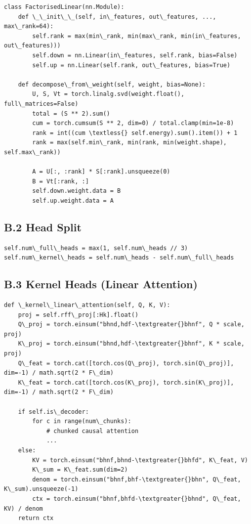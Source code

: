 \begin{lstlisting}
class FactorisedLinear(nn.Module):
    def \_\_init\_\_(self, in\_features, out\_features, ..., max\_rank=64):
        self.rank = max(min\_rank, min(max\_rank, min(in\_features, out\_features)))
        self.down = nn.Linear(in\_features, self.rank, bias=False)
        self.up = nn.Linear(self.rank, out\_features, bias=True)

    def decompose\_from\_weight(self, weight, bias=None):
        U, S, Vt = torch.linalg.svd(weight.float(), full\_matrices=False)
        total = (S ** 2).sum()
        cum = torch.cumsum(S ** 2, dim=0) / total.clamp(min=1e-8)
        rank = int((cum \textless{} self.energy).sum().item()) + 1
        rank = max(self.min\_rank, min(rank, min(weight.shape), self.max\_rank))
        
        A = U[:, :rank] * S[:rank].unsqueeze(0)
        B = Vt[:rank, :]
        self.down.weight.data = B
        self.up.weight.data = A
\end{lstlisting}

\subsection{B.2 Head Split}

\begin{lstlisting}
self.num\_full\_heads = max(1, self.num\_heads // 3)
self.num\_kernel\_heads = self.num\_heads - self.num\_full\_heads
\end{lstlisting}

\subsection{B.3 Kernel Heads (Linear Attention)}

\begin{lstlisting}
def \_kernel\_linear\_attention(self, Q, K, V):
    proj = self.rff\_proj[:Hk].float()
    Q\_proj = torch.einsum("bhnd,hdf-\textgreater{}bhnf", Q * scale, proj)
    K\_proj = torch.einsum("bhnd,hdf-\textgreater{}bhnf", K * scale, proj)
    Q\_feat = torch.cat([torch.cos(Q\_proj), torch.sin(Q\_proj)], dim=-1) / math.sqrt(2 * F\_dim)
    K\_feat = torch.cat([torch.cos(K\_proj), torch.sin(K\_proj)], dim=-1) / math.sqrt(2 * F\_dim)
    
    if self.is\_decoder:
        for c in range(num\_chunks):
            # chunked causal attention
            ...
    else:
        KV = torch.einsum("bhnf,bhnd-\textgreater{}bhfd", K\_feat, V)
        K\_sum = K\_feat.sum(dim=2)
        denom = torch.einsum("bhnf,bhf-\textgreater{}bhn", Q\_feat, K\_sum).unsqueeze(-1)
        ctx = torch.einsum("bhnf,bhfd-\textgreater{}bhnd", Q\_feat, KV) / denom
    return ctx
\end{lstlisting}

